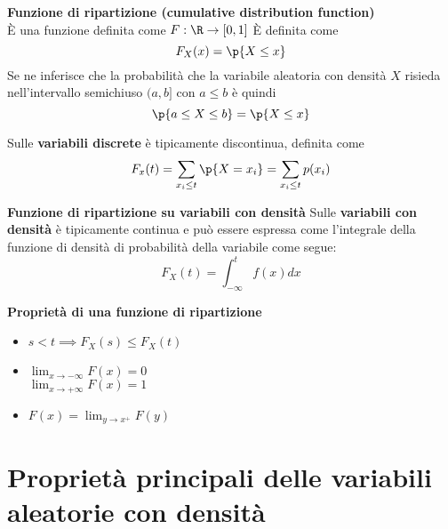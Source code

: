 \begin{defn}
    \textbf{Funzione di ripartizione (cumulative distribution function)} \\
    È una funzione definita come $ F : \R \to [0,1]$ È definita come
    \begin{equation*}
        F_X(x) = \p{X \leq x}
    \end{equation*}
    Se ne inferisce che la probabilità che la variabile aleatoria con densità $
    X $ risieda nell'intervallo semichiuso $(a,b]$ con $ a \leq b $ è quindi
    \begin{equation*}
        \p{a \leq X \leq b} = \p{X \leq x}
    \end{equation*}

    Sulle \textbf{variabili discrete} è tipicamente discontinua, definita come
    \begin{equation*}
        F_x(t) = \sum_{x_i \leq t} \p{X = x_i} = \sum_{x_i \leq t} p(x_i)
    \end{equation*}

    \textbf{Funzione di ripartizione su variabili con densità}
    Sulle \textbf{variabili con densità} è tipicamente continua e può essere
    espressa come l'integrale della funzione di densità di probabilità della
    variabile come segue:
    \begin{equation*}
        F_X(t) = \int_{-\infty}^{t} f(x) dx
    \end{equation*}
\end{defn}

\begin{defn}
    \textbf{Proprietà di una funzione di ripartizione} \\
    \begin{itemize}
        \item $s < t \implies F_X(s) \leq F_X(t)$ %
        \item $\lim_{x \to -\infty} F(x) = 0$ \\
            $\lim_{x \to +\infty} F(x) = 1$
        \item $F(x) = \lim_{y \to x^+} F(y)$
    \end{itemize}
\end{defn}

\section{Proprietà principali delle variabili aleatorie con densità}

